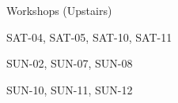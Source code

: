 \documentclass{article}
\newcommand{\room}[1]{
    \noindent
    #1
    \vspace{.2in}

}
\begin{document}
\rssheader[2in]

\vfill

\begin{minipage}{\textwidth}
    \begin{minipage}{.25\textwidth}
        \begin{center}
            \rssarrowup[1in]
        \end{center}
    \end{minipage}
    \hfill
    \begin{minipage}{.7\textwidth}
        \begin{center}
            \rssbig
            \room{Workshops (Upstairs)}
            \rsstiny
            \room{SAT-04, SAT-05, SAT-10, SAT-11}
            \room{SUN-02, SUN-07, SUN-08 \par SUN-10, SUN-11, SUN-12}
        \end{center}
    \end{minipage}
\end{minipage}

\vfill
\end{document}
